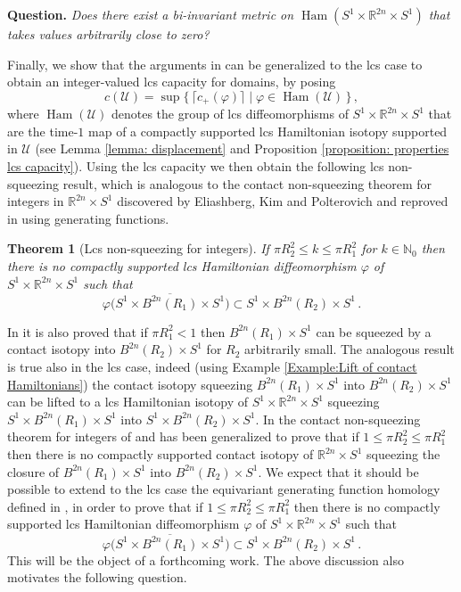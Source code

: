 \documentclass{amsart}
\DeclareMathOperator{\Ham}{Ham}
\newtheorem{thm}{Theorem}[section]
\theoremstyle{remark}
\begin{document}
\textbf{Question.}
\textit{Does there exist a bi-invariant metric on $\Ham(S^1 \times \mathbb{R}^{2n} \times S^1)$
that takes values arbitrarily close to zero?}

Finally,
we show that the arguments in \cite{San11, San10}
can be generalized to the lcs case
to obtain an integer-valued  lcs capacity for domains,
by posing
\[
c (\mathcal{U})
= \sup \{\, \lceil c_+ (\varphi) \rceil \;\lvert \; \varphi \in \Ham (\mathcal{U})\,\} \,,
\]
where $\Ham (\mathcal{U})$ denotes
the group of lcs diffeomorphisms of $S^1 \times \mathbb{R}^{2n} \times S^1$
that are the time-$1$ map
of a compactly supported lcs Hamiltonian isotopy supported in $\mathcal{U}$
(see Lemma \ref{lemma: displacement}
and Proposition \ref{proposition: properties lcs capacity}).
Using the lcs capacity we then obtain the following lcs non-squeezing result,
which is analogous to the contact non-squeezing theorem for integers
in $\mathbb{R}^{2n} \times S^1$
discovered by Eliashberg, Kim and Polterovich \cite{EKP}
and reproved in \cite{San11} using generating functions.

\begin{thm}[Lcs non-squeezing for integers]\label{theorem: main}
If $\pi R_2^2 \leq k \leq \pi R_1^2$ for $k \in \mathbb{N}_0$
then there is no compactly supported lcs Hamiltonian diffeomorphism $\varphi$
of $S^1 \times \mathbb{R}^{2n} \times S^1$
such that
\[
\varphi \big(\overline{S^1 \times B^{2n}(R_1) \times S^1}\big)
\subset S^1 \times B^{2n}(R_2) \times S^1 \,.
\]
\end{thm}

In \cite{EKP} it is also proved that
if $\pi R_1^2 < 1$ then $B^{2n}(R_1) \times S^1$
can be squeezed by a contact isotopy into $B^{2n}(R_2) \times S^1$
for $R_2$ arbitrarily small.
The analogous result is true also in the lcs case,
indeed (using Example \ref{Example:Lift of contact Hamiltonians})
the contact isotopy squeezing $B^{2n}(R_1) \times S^1$ into $B^{2n}(R_2) \times S^1$
can be lifted to a lcs Hamiltonian isotopy of $S^1 \times \mathbb{R}^{2n} \times S^1$
squeezing $S^1 \times B^{2n}(R_1) \times S^1$ into $S^1 \times B^{2n}(R_2) \times S^1$.
In \cite{Chiu, Fraser, FSZ}
the contact non-squeezing theorem for integers
of \cite{EKP} and \cite{San10}
has been generalized to prove that
if $1 \leq \pi R_2^2 \leq \pi R_1^2$
then there is no compactly supported contact isotopy
of $\mathbb{R}^{2n} \times S^1$
squeezing the closure of  $B^{2n}(R_1) \times S^1$ into $B^{2n}(R_2) \times S^1$.
We expect that it should be possible to extend to the lcs case
the equivariant generating function homology defined in \cite{FSZ},
in order to prove that if $1 \leq \pi R_2^2 \leq \pi R_1^2$
then there is no compactly supported lcs Hamiltonian diffeomorphism $\varphi$
of $S^1 \times \mathbb{R}^{2n} \times S^1$
such that
\[
\varphi \big(\overline{S^1 \times B^{2n}(R_1) \times S^1}\big)
\subset S^1 \times B^{2n}(R_2) \times S^1 \,.
\]
This will be the object of a forthcoming work.
The above discussion also motivates the following question.
\end{document}
